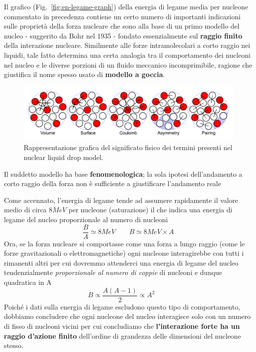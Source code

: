 Il grafico (Fig.~\ref{fig:en-legame-graph}) della energia di legame media per nucleone commentato in precedenza
contiene un certo numero di importanti indicazioni
sulle proprietà della forza nucleare che sono alla base di un primo
modello del nucleo - suggerito da Bohr nel 1935 - fondato essenzialmente
sul \textbf{raggio finito} della interazione nucleare.
Similmente alle forze intramolecolari a corto raggio nei liquidi,
tale fatto determina una certa analogia tra il comportamento dei nucleoni
nel nucleo e le diverse porzioni di un fluido meccanico incomprimibile, ragione che
giustifica il nome spesso usato di \textbf{modello a goccia}.
\begin{figure}
	\centering
	\includegraphics{figs/liquid-drop-model}
	\caption{Rappresentazione grafica del significato fisico dei termini presenti nel nuclear liquid drop model.}
	\label{fig:liquid-drop-model}
\end{figure}

Il suddetto modello ha base \textbf{fenomenologica}; la sola ipotesi
dell'andamento a corto raggio della forza non è sufficiente a
giustificare l'andamento reale

Come accennato, l'energia di legame tende ad assumere rapidamente il
valore medio di circa \(8MeV\) per nucleone (saturazione) il che indica
una energia di legame del nucleo proporzionale al numero di nucleoni
\begin{equation}
	\frac{B}{A} \simeq 8 MeV \qquad B \simeq 8 MeV \times A
    \label{eq:saturation-binding-energy-per-nucleon}
\end{equation}
Ora, se la forza nucleare si comportasse come una forza a lungo
raggio (come le forze gravitazionali o elettromagnetiche) ogni nucleone
interagirebbe con tutti i rimanenti altri per cui dovremmo attenderci
una energia di legame del nucleo tendenzialmente \emph{proporzionale al numero
di coppie} di nucleoni e dunque quadratica in A
\[
	B \propto \frac{A(A-1)}{2} \propto A^{2} \qquad
\]
Poiché i dati sulla energia di legame escludono questo tipo di
comportamento, dobbiamo concludere che ogni nucleone del nucleo
interagisce solo con un numero di fisso di nucleoni vicini per cui
concludiamo che \textbf{l'interazione forte ha un raggio d'azione finito}
dell'ordine di grandezza delle dimensioni del nucleone stesso.

